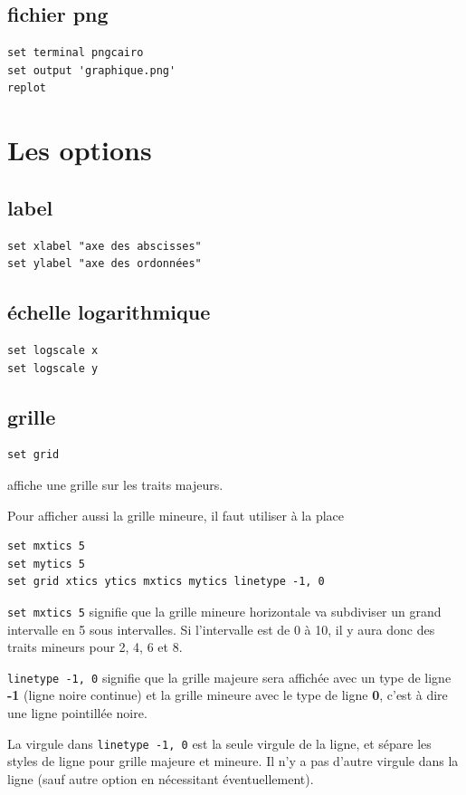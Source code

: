 \documentclass[a4paper,twoside]{article}
\begin{document}
\subsection{fichier png}
\begin{verbatim}
set terminal pngcairo
set output 'graphique.png'
replot
\end{verbatim}


\section{Les options}
\subsection{label}
\begin{verbatim}
set xlabel "axe des abscisses"
set ylabel "axe des ordonnées"
\end{verbatim}

\subsection{échelle logarithmique}
\begin{verbatim}
set logscale x
set logscale y
\end{verbatim}

\subsection{grille}
\begin{verbatim}
set grid
\end{verbatim}
affiche une grille sur les traits majeurs.

Pour afficher aussi la grille mineure, il faut utiliser à la place 
\begin{verbatim}
set mxtics 5
set mytics 5
set grid xtics ytics mxtics mytics linetype -1, 0
\end{verbatim}
\texttt{set mxtics 5} signifie que la grille mineure horizontale va subdiviser un grand intervalle en 5 sous intervalles. Si l'intervalle est de 0 à 10, il y aura donc des traits mineurs pour 2, 4, 6 et 8. 

\texttt{linetype -1, 0} signifie que la grille majeure sera affichée avec un type de ligne \textbf{-1} (ligne noire continue) et la grille mineure avec le type de ligne \textbf{0}, c'est à dire une ligne pointillée noire.

\begin{attention}
La virgule dans \texttt{linetype -1, 0} est la seule virgule de la ligne, et sépare les styles de ligne pour grille majeure et mineure. Il n'y a pas d'autre virgule dans la ligne (sauf autre option en nécessitant éventuellement).
\end{attention}
\end{document}
